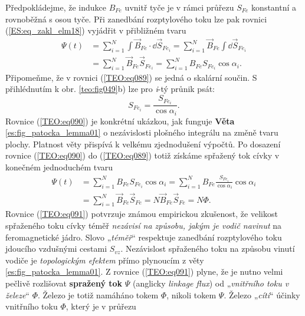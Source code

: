       Předpokládejme, že indukce \(B_{Fe}\) uvnitř tyče je v rámci průřezu \(S_{Fe}\) konstantní a 
      rovnoběžná s osou tyče. Při zanedbání rozptylového toku lze pak rovnici 
      (\ref{ES:eq_zakl_elm18}) vyjádřit v přibližném tvaru
      \begin{align}\label{TEO:eq089}
      \Psi(t) &= \sum_{i=1}^{N}\int\vec{B}_{Fe}\cdot \dd{\vec{S}}_{Fe_i} 
               = \sum_{i=1}^{N}\vec{B}_{Fe}\int \dd{\vec{S}}_{Fe_i}  \nonumber\\
              &= \sum_{i=1}^{N}\vec{B}_{Fe}\vec{S}_{Fe_i}
               = \sum_{i=1}^{N}B_{Fe}{S}_{Fe_i}\cos\alpha_i.
      \end{align}
      Připomeňme, že v rovnici (\ref{TEO:eq089}) se jedná o skalární součin. S přihlédnutím 
      k obr. \ref{teo:fig049}b) lze pro \emph{i}-tý průnik psát:
      \begin{equation}\label{TEO:eq090}
        S_{Fe_i} = \frac{S_{Fe_i}}{\cos\alpha_i}.
      \end{equation}
      Rovnice (\ref{TEO:eq090}) je konkrétní ukázkou, jak funguje \textbf{Věta}
      \ref{es:fig_patocka_lemma01} o nezávislosti plošného integrálu na změně tvaru plochy. Platnost
      věty přispívá k velkému zjednodušení výpočtů. Po dosazení rovnice (\ref{TEO:eq090}) do
      (\ref{TEO:eq089}) totiž získáme spřažený tok cívky v konečném jednoduchém tvaru
      \begin{align}\label{TEO:eq091}
        \Psi(t) &= \sum_{i=1}^{N}B_{Fe}{S}_{Fe_i}\cos\alpha_i 
                 = \sum_{i=1}^{N}B_{Fe}\frac{{S}_{Fe_i}}{\cos\alpha_i}\cos\alpha_i  \nonumber\\
                &= \sum_{i=1}^{N}\vec{B}_{Fe}\vec{S}_{Fe}
                 = N\vec{B}_{Fe}\vec{S}_{Fe} = N\Phi.
      \end{align}
      Rovnice (\ref{TEO:eq091}) potvrzuje známou empirickou zkušenost, že velikost spřaženého toku
      cívky téměř \emph{nezávisí na způsobu, jakým je vodič navinut} na feromagnetické jádro. Slovo
      „\emph{téměř}“ respektuje zanedbání rozptylového toku jdoucího vzdušnými cestami \(S_{vz}\).
      Nezávislost spřaženého toku na způsobu vinutí vodiče je \emph{topologickým efektem} přímo
      plynoucím z věty \ref{es:fig_patocka_lemma01}. Z rovnice (\ref{TEO:eq091}) plyne, že je nutno
      velmi pečlivě rozlišovat \textbf{spražený tok} \(\Psi\) (anglicky \emph{linkage flux}) od
      „\emph{vnitřního toku v železe}“ \(\Phi\). Železo je totiž namáháno tokem \(\Phi\), nikoli
      tokem \(\Psi\). Železo „\emph{cítí}“ účinky vnitřního toku \(\Phi\), který je v průřezu
